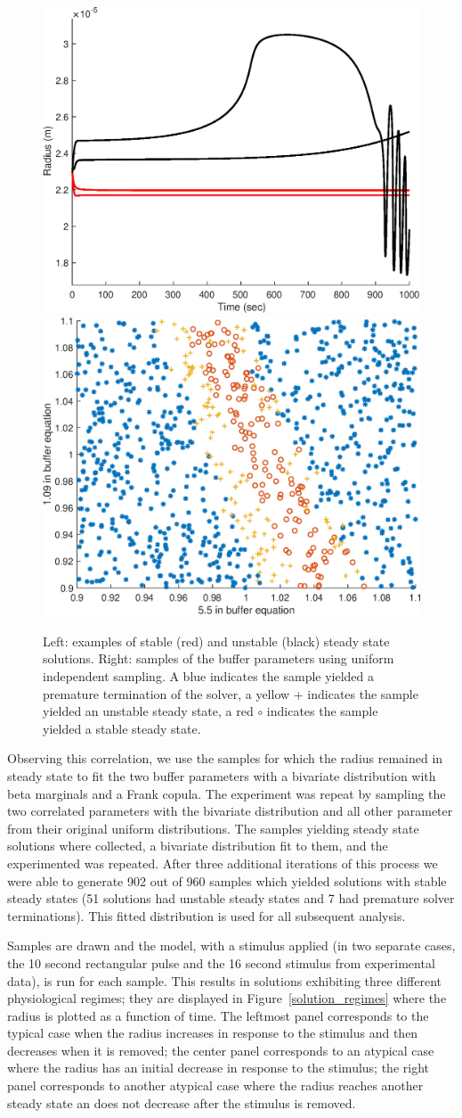 \documentclass[12pt]{article}
\numberwithin{equation}{section}
\begin{document}
\begin{figure}[h]
\centering
\includegraphics[width=.4 \textwidth]{Figures/Steady_State_Curves.eps}
\includegraphics[width=.4 \textwidth]{Figures/First_Iteration_Samples.eps}
\caption{Left: examples of stable (red) and unstable (black) steady state solutions. Right: samples of the buffer parameters using uniform independent sampling. A blue \* indicates the sample yielded a premature termination of the solver, a yellow + indicates the sample yielded an unstable steady state, a red $\circ$ indicates the sample yielded a stable steady state.}
\label{steady_states}
\end{figure}

Observing this correlation, we use the samples for which the radius remained in steady state to fit the two buffer parameters with a bivariate distribution with beta marginals and a Frank copula. The experiment was repeat by sampling the two correlated parameters with the bivariate distribution and all other parameter from their original uniform distributions. The samples yielding steady state solutions where collected, a bivariate distribution fit to them, and the experimented was repeated. After three additional iterations of this process we were able to generate 902 out of 960 samples which yielded solutions with stable steady states (51 solutions had unstable steady states and 7 had premature solver terminations). This fitted distribution is used for all subsequent analysis. 

Samples are drawn and the model, with a stimulus applied (in two separate cases, the 10 second rectangular pulse and the 16 second stimulus from experimental data), is run for each sample. This results in solutions exhibiting three different physiological regimes; they are displayed in Figure~\ref{solution_regimes} where the radius is plotted as a function of time. The leftmost panel corresponds to the typical case when the radius increases in response to the stimulus and then decreases when it is removed; the center panel corresponds to an atypical case where the radius has an initial decrease in response to the stimulus; the right panel corresponds to another atypical case where the radius reaches another steady state an does not decrease after the stimulus is removed.
\end{document}
